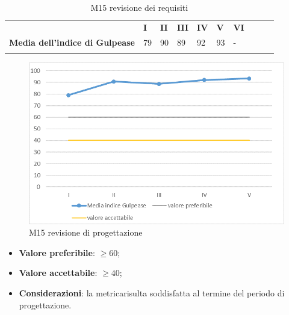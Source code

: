\begin{longtable} {						
		>{}p{70mm}  		
		>{}p{8mm}		
		>{}p{8mm}		
		>{}p{8mm}		
		>{}p{8mm}		
		>{}p{8mm}		
		>{}p{8mm}
		>{}p{8mm}
		>{}p{8mm}
		>{}p{8mm}				
	}			
	\rowcolor{gray!50}
	\textbf{} & \textbf{I} & \textbf{II} & \textbf{III} & \textbf{IV} & \textbf{V} & \textbf{VI} \TBstrut \\ [2mm]
	\textbf{Media dell'indice di Gulpease} & 79 & 90 & 89 & 92 & 93 & - \TBstrut \\ [2mm]
	\rowcolor{white}
	\caption{M15 revisione dei requisiti}
\end{longtable}
\begin{figure}[H] 	
	\includegraphics[width=\linewidth]{./img/grafici/RP20.png}	
	\caption{M15 revisione di progettazione}	
\end{figure}
\begin{itemize}
	\item \textbf{Valore preferibile}: $\ge60$;
	\item \textbf{Valore accettabile}: $\ge40$;
	\item \textbf{Considerazioni}: la metrica\glosp risulta soddisfatta al termine del periodo di progettazione\glo.
\end{itemize}
